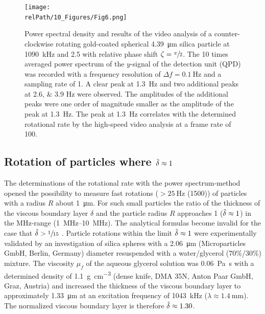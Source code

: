 \begin{figure}
    \centering
    \texttt{[image: \\relPath/10\_Figures/Fig6.png]}
    \caption{Power spectral density and results of the video analysis of a 
      counter-clockwise rotating gold-coated spherical \SI{4.39}{\micro\meter} 
      silica particle at \SI{1090}{\kilo\hertz} and \SI{2.5}{\Vrms} with 
      relative phase shift $\zeta= \sfrac{\pi}{2}$. The 10 times averaged power 
      spectrum of the $y$-signal of the detection unit (QPD) was recorded with a 
      frequency resolution of $\Delta f=\SI{0.1}{\hertz}$ and a sampling rate of 
      \SI{1}{\MS}. A clear peak at \SI{1.3}{\hertz} and two additional peaks at 
      \numlist{2.6; 3.9} \si{\hertz} were observed. The amplitudes of the 
      additional peaks were one order of magnitude smaller as the amplitude of 
      the peak at \SI{1.3}{\hertz}. The peak at \SI{1.3}{\hertz} correlates with 
  the determined rotational rate by the high-speed video analysis at a frame 
  rate of \SI{100}{\fps}.\label{fig:VT-Fig6}}
\end{figure}%

\subsection{Rotation of particles where $\tilde{\delta} \approx 
1$\label{sec:VT-rotationParticles}}

The determinations of the rotational rate with the power spectrum-method opened 
the possibility to measure fast rotations ($>\SI{25}{\hertz}$ (\SI{1500}{\rpm})) 
of particles with a radius $R$ about \SI{1}{\micro\meter}.  For such small 
particles the ratio of the thickness of the viscous boundary layer $\delta$ and 
the particle radius $R$ approaches 1 ($\tilde{\delta} \approx 1$) in the 
\si{\mega\hertz}-range (\SIrange{1}{10}{\mega\hertz}). The analytical formulas 
become invalid for the case that $\tilde{\delta} > \sfrac{1}{15}$ \cite{Hahn2016}.  
Particle rotations within the limit $\tilde{\delta} \approx 1$ were experimentally 
validated by an investigation of silica spheres with a \SI{2.06}{\micro\meter} 
(Microparticles GmbH, Berlin, Germany) diameter resuspended with a 
water/glycerol (70$\%$/30$\%$) mixture.  The viscosity $\mu_f$ of the aqueous 
glycerol solution was \SI{0.06}{\pascal\second} \cite{Jerome1968} with a 
determined density of \SI{1.1}{\gram\per\centi\meter\cubed} (dense knife, DMA 
35N, Anton Paar GmbH, Graz, Austria) and increased the thickness of the viscous 
boundary layer to approximately \SI{1.33}{\micro\meter} at an excitation 
frequency of \SI{1043}{\kilo\hertz} ($\lambda \approx \SI{1.4}{\mm}$). The 
normalized viscous boundary layer is therefore $\tilde{\delta} \approx 1.30$.

